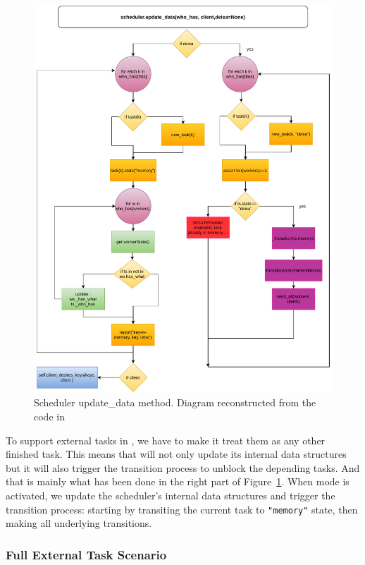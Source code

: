 \begin{figure}[h!]\centering
\includegraphics[scale=0.5]{figures/scheduler_update_data().pdf}
\caption{Scheduler update\_data method. Diagram reconstructed from the code in~\cite{amal_distributed_2022}}
\label{figsceculerupdatedata}
\end{figure}

To support external tasks in \dask, we have to make it treat them as any other finished task. This means that \dask will not only update its internal data structures but it will also trigger the transition process to unblock the depending tasks.  And that is mainly what has been done in the right part of Figure~\ref{figsceculerupdatedata}. When \deisa mode is activated, we update the scheduler's internal data structures and trigger the transition process: starting by transiting the current task to \texttt{"memory"} state, then making all underlying transitions.    


\subsubsection{Full External Task Scenario}

